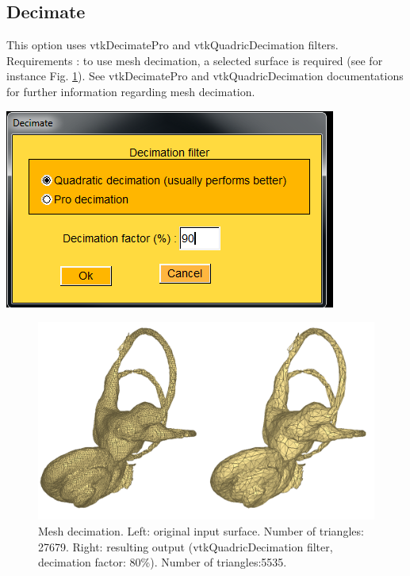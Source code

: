 \subsection{Decimate}
\noindent
\begin{minipage}{0.5\textwidth}


This option uses vtkDecimatePro and vtkQuadricDecimation filters. Requirements : to use mesh decimation, a selected
surface is required (see for instance Fig. \ref{decimate}). See vtkDecimatePro and vtkQuadricDecimation documentations for further information regarding
mesh decimation.

\end{minipage}    
\begin{minipage}{0.5\textwidth}\centering
  \includegraphics[scale=0.5]{images/Edit_selected_objects/07_decimate.png}
 \end{minipage} 
\noindent

\begin{figure}
  \centering
  \includegraphics[scale=0.25]{images/Edit_selected_objects/07_decimate_input_output.png} 
	\caption{Mesh decimation. Left: original input surface. Number of triangles: 27679. Right: resulting output (vtkQuadricDecimation filter,
decimation factor: 80\%). Number of triangles:5535.
}
\label{decimate}
 
\end{figure}




